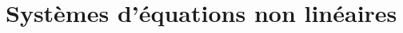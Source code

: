 \documentclass[resume]{subfiles}
\begin{document}
    \section{Systèmes d'équations non linéaires}


    
\end{document}
